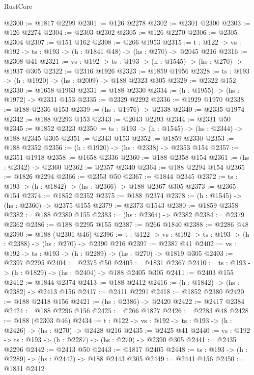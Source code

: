 \begin{lexlean}{RustCore}
\begin{coremodule}
@2300 := @1817 @2299
@2301 := @126 @2278
@2302 := @2301 @2300
@2303 := @126 @2274
@2304 := @2303 @2302
@2305 := @126 @2270
@2306 := @2305 @2304
@2307 := @151 @162
@2308 := @266 @1953
@2315 := {t : @122} -> {vs : @192} -> {ts : @193} -> (h : @1841 @48) -> (hs : @270) -> @2045 @216
@2316 := @2308 @41
@2321 := {vs : @192} -> {ts : @193} -> (h : @1545) -> (hs : @270) -> @1937 @305
@2322 := @2316 @1926
@2323 := @1859 @1956
@2328 := {ts : @193} -> (h : @1920) -> (hs : @2009) -> @188 @2323 @305
@2329 := @2322 @152
@2330 := @1658 @1963
@2331 := @188 @2330
@2334 := (h : @1955) -> (hs : @1972) -> @2331 @153
@2335 := @2329 @2292
@2336 := @1929 @1970
@2338 := @188 @2336 @153
@2339 := (hs : @1976) -> @2338
@2340 := @2335 @1974
@2342 := @188 @2293 @153
@2343 := @2043 @2293
@2344 := @2331 @50
@2345 := @1852 @2323
@2350 := {ts : @193} -> (h : @1545) -> (hs : @2344) -> @188 @2345 @305
@2351 := @2343 @153
@2352 := @1859 @2330
@2353 := @188 @2352
@2356 := (h : @1920) -> (hs : @2338) -> @2353 @154
@2357 := @2351 @1918
@2358 := @1658 @2336
@2360 := @188 @2358 @154
@2361 := (hs : @2342) -> @2360
@2362 := @2357 @2340
@2364 := @188 @2294 @154
@2365 := @1826 @2294
@2366 := @2353 @50
@2367 := @1844 @2345
@2372 := {ts : @193} -> (h : @1842) -> (hs : @2366) -> @188 @2367 @305
@2373 := @2365 @154
@2374 := @1852 @2352
@2375 := @188 @2374
@2378 := (h : @1545) -> (hs : @2360) -> @2375 @155
@2379 := @2373 @1543
@2380 := @1859 @2358
@2382 := @188 @2380 @155
@2383 := (hs : @2364) -> @2382
@2384 := @2379 @2362
@2386 := @188 @2295 @155
@2387 := @266 @1840
@2388 := @2286 @48
@2390 := @188 (@2301 @46)
@2396 := {t : @122} -> {vs : @192} -> {ts : @193} -> (h : @2388) -> (hs : @270) -> @2390 @216
@2397 := @2387 @41
@2402 := {vs : @192} -> {ts : @193} -> (h : @2289) -> (hs : @270) -> @1819 @305
@2403 := @2397 @2295
@2404 := @2375 @50
@2405 := @1831 @2367
@2410 := {ts : @193} -> (h : @1829) -> (hs : @2404) -> @188 @2405 @305
@2411 := @2403 @155
@2412 := @1844 @2374
@2413 := @188 @2412
@2416 := (h : @1842) -> (hs : @2382) -> @2413 @156
@2417 := @2411 @2291
@2418 := @1852 @2380
@2420 := @188 @2418 @156
@2421 := (hs : @2386) -> @2420
@2422 := @2417 @2384
@2424 := @188 @2296 @156
@2425 := @266 @1827
@2426 := @2283 @48
@2428 := @188 (@2303 @46)
@2434 := {t : @122} -> {vs : @192} -> {ts : @193} -> (h : @2426) -> (hs : @270) -> @2428 @216
@2435 := @2425 @41
@2440 := {vs : @192} -> {ts : @193} -> (h : @2287) -> (hs : @270) -> @2390 @305
@2441 := @2435 @2296
@2442 := @2413 @50
@2443 := @1817 @2405
@2448 := {ts : @193} -> (h : @2289) -> (hs : @2442) -> @188 @2443 @305
@2449 := @2441 @156
@2450 := @1831 @2412

\end{coremodule}
\end{lexlean}
